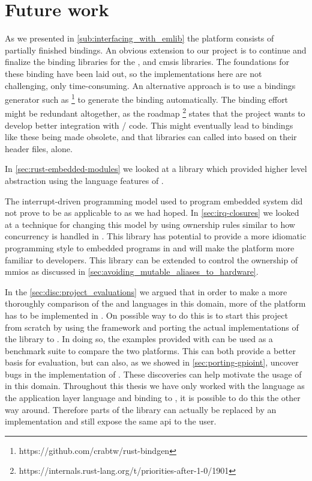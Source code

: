 \section{Future work}
\label{chap:future}

As we presented in \autoref{sub:interfacing_with_emlib} the platform consists of partially finished bindings.
An obvious extension to our project is to continue and finalize the binding libraries for the {\emlib}, {\emdrv} and \gls{cmsis} libraries.
The foundations for these binding have been laid out, so the implementations here are not challenging, only time-consuming.
An alternative approach is to use a bindings generator such as  \footnote{https://github.com/crabtw/rust-bindgen} to generate the binding automatically.
The binding effort might be redundant altogether, as the {\rust} roadmap \footnote{https://internals.rust-lang.org/t/priorities-after-1-0/1901} states that the project wants to develop better integration with {\C}/{\Cpp} code.
This might eventually lead to bindings like these being made obsolete, and that {\C} libraries can called into based on their header files, alone.

In \autoref{sec:rust-embedded-modules} we looked at a library which provided higher level abstraction using the language features of {\rust}.

The interrupt-driven programming model used to program embedded system did not prove to be as applicable to {\rust} as we had hoped.
In \autoref{sec:irq-closures} we looked at a technique for changing this model by using ownership rules similar to how concurrency is handled in {\rust}.
This library has potential to provide a more idiomatic programming style to embedded programs in {\rust} and will make the platform more familiar to {\rust} developers.
This library can be extended to control the ownership of \glspl{mmio} as discussed in \autoref{sec:avoiding_mutable_aliases_to_hardware}.

In the \autoref{sec:disc:project_evaluations} we argued that in order to make a more thoroughly comparison of the {\C} and {\rust} languages in this domain, more of the platform has to be implemented in {\rust}.
On possible way to do this is to start this project from scratch by using the  framework and porting the actual implementations of the {\emlib} library to {\rust}.
In doing so, the examples provided with {\emlib} can be used as a benchmark suite to compare the two platforms.
This can both provide a better basis for evaluation, but can also, as we showed in \autoref{sec:porting-gpioint}, uncover bugs in the {\C} implementation of {\emlib}.
These discoveries can help motivate the usage of {\rust} in this domain.
Throughout this thesis we have only worked with the {\rust} language as the application layer language and binding to {\C}, it is possible to do this the other way around.
Therefore parts of the {\emlib} library can actually be replaced by an {\rust} implementation and still expose the same \gls{api} to the user.
